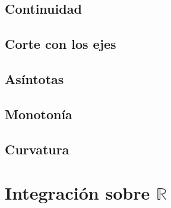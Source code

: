 \section{Continuidad}
\section{Corte con los ejes}
\section{Asíntotas}
\section{Monotonía}
\section{Curvatura}
\chapter{Integración sobre $\mathbb{R}$}
\minitoc